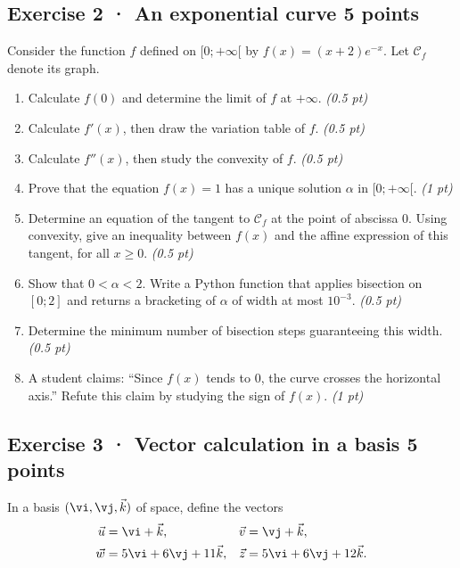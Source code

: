 \subsection*{Exercise 2 · An exponential curve \hfill 5 points}Consider the function $f$ defined on $[0;+\infty[$ by $f(x)=(x+2)e^{-x}$. Let $\mathcal C_f$ denote its graph.

\begin{enumerate}

\item Calculate $f(0)$ and determine the limit of $f$ at $+\infty$. \hfill\textit{(0.5 pt)}

\item Calculate $f'(x)$, then draw the variation table of $f$. \hfill\textit{(0.5 pt)}

\item Calculate $f''(x)$, then study the convexity of $f$. \hfill\textit{(0.5 pt)}

\item Prove that the equation $f(x)=1$ has a unique solution $\alpha$ in $[0;+\infty[$. \hfill\textit{(1 pt)}

\item Determine an equation of the tangent to $\mathcal C_f$ at the point of abscissa $0$. Using convexity, give an inequality between $f(x)$ and the affine expression of this tangent, for all $x\ge0$. \hfill\textit{(0.5 pt)}

\item Show that $0<\alpha<2$. Write a Python function that applies bisection on $[0;2]$ and returns a bracketing of $\alpha$ of width at most $10^{-3}$. \hfill\textit{(0.5 pt)}

\item Determine the minimum number of bisection steps guaranteeing this width. \hfill\textit{(0.5 pt)}

\clearpage\item A student claims: ``Since $f(x)$ tends to $0$, the curve crosses the horizontal axis.'' Refute this claim by studying the sign of $f(x)$. \hfill\textit{(1 pt)}

\end{enumerate}

\clearpage{}\par

\subsection*{Exercise 3 · Vector calculation in a basis \hfill 5 points}In a basis $(\vi,\vj,\vec k)$ of space, define the vectors
\[\begin{aligned}\vec u&=\vi+\vec k,&\vec v&=\vj+\vec k,\\
\vec w&=5\vi+6\vj+11\vec k,&\vec z&=5\vi+6\vj+12\vec k.\end{aligned}\]

